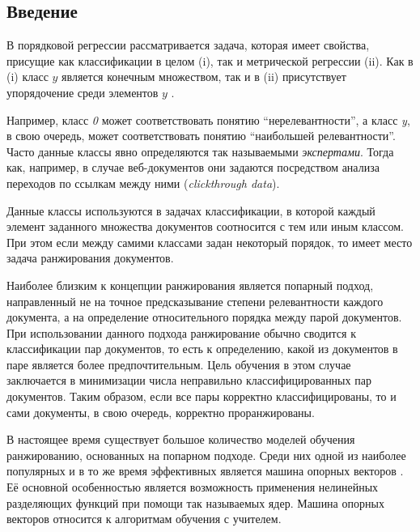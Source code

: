 \documentclass[12pt,a4paper,oneside]{article}
\begin{document}
\begin{multicols}{2}
\chapter{Введение}

\par
В порядковой регрессии рассматривается задача, которая имеет свойства, присущие как классификации в целом (i), так и метрической регрессии (ii). 
Как в (i) класс $y$ является конечным множеством, так и в (ii) присутствует упорядочение среди элементов $y$ .

\par
Например, класс \emph{0} может соответствовать понятию ``нерелевантности'', а класс \emph{y}, в свою очередь, может соответствовать понятию ``наибольшей релевантности''. 
Часто данные классы явно определяются так называемыми \emph{экспертами}. 
Тогда как, например, в случае веб-документов они задаются посредством анализа переходов по ссылкам между ними (\emph{clickthrough data}). 

\par
Данные классы используются в задачах классификации, в которой каждый элемент заданного множества документов соотносится с тем или иным классом. 
При этом если между самими классами задан некоторый порядок, то имеет место задача ранжирования документов. 

\par
Наиболее близким к концепции ранжирования является попарный подход, направленный не на точное предсказывание степени релевантности каждого документа, а на определение относительного порядка между парой документов. 
При использовании данного подхода ранжирование обычно сводится к классификации пар документов, то есть к определению, какой из документов в паре является более предпочтительным.
Цель обучения в этом случае заключается в минимизации числа неправильно классифицированных пар документов. 
Таким образом, если все пары корректно классифицированы, то и сами документы, в свою очередь, корректно проранжированы. 

\par
В настоящее время существует большое количество моделей обучения ранжированию, основанных на попарном подходе. 
Среди них одной из наиболее популярных и в то же время эффективных является машина опорных векторов  . 
Её основной особенностью является возможность применения нелинейных разделяющих функций при помощи так называемых ядер. 
Машина опорных векторов относится к алгоритмам обучения с учителем. 


\end{multicols}
\end{document}
